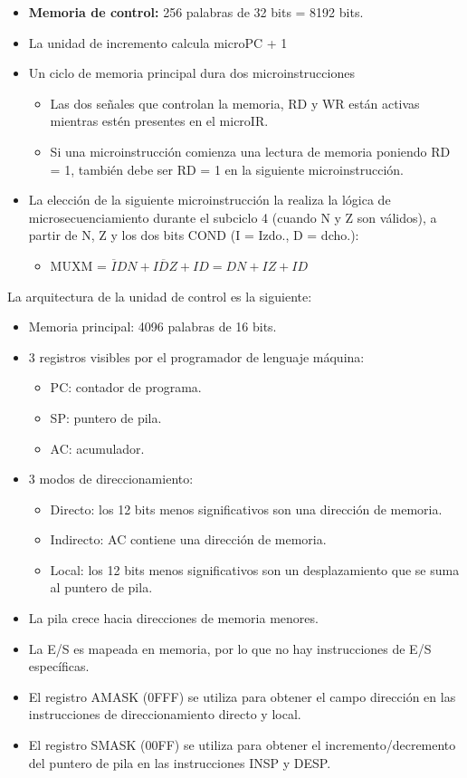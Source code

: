 \begin{itemize}
    \item \textbf{Memoria de control:} 256 palabras de 32 bits = 8192 bits.
    \item La unidad de incremento calcula microPC + 1
    \item Un ciclo de memoria principal dura dos microinstrucciones 
        \begin{itemize}
            \item Las dos señales que controlan la memoria, RD y WR están activas mientras estén presentes en el microIR.
                \item Si una microinstrucción comienza una lectura de memoria poniendo RD = 1, también debe ser RD = 1 en la siguiente microinstrucción.
        \end{itemize}
    \item La elección de la siguiente microinstrucción la realiza la lógica de microsecuenciamiento durante el subciclo 4 (cuando N y Z son válidos), a partir de N, Z y los dos bits COND (I = Izdo., D = dcho.):
        \begin{itemize}
            \item MUXM = $\overline{I} D N + I \overline{D} Z + I D = D N + I Z + I D$
        \end{itemize}
\end{itemize}
La arquitectura de la unidad de control es la siguiente:
\begin{itemize}
    \item Memoria principal: 4096 palabras de 16 bits.
    \item 3 registros visibles por el programador de lenguaje máquina:
        \begin{itemize}
            \item PC: contador de programa.
            \item SP: puntero de pila.
            \item AC: acumulador.
        \end{itemize}
    \item 3 modos de direccionamiento: 
        \begin{itemize}
            \item Directo: los 12 bits menos significativos son una dirección de memoria.
            \item Indirecto: AC contiene una dirección de memoria.
            \item Local: los 12 bits menos significativos son un desplazamiento que se suma al puntero de pila.
        \end{itemize}
    \item La pila crece hacia direcciones de memoria menores.
    \item La E/S es mapeada en memoria, por lo que no hay instrucciones de E/S específicas.
    \item El registro AMASK (0FFF) se utiliza para obtener el campo dirección en las instrucciones de direccionamiento directo y local.
    \item El registro SMASK (00FF) se utiliza para obtener el incremento/decremento del puntero de pila en las instrucciones INSP y DESP.
\end{itemize}
